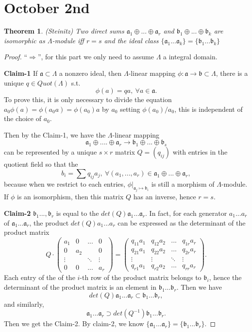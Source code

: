 \documentclass[11pt]{article}
\newtheorem{thm}{Theorem}[section]
\newcommand{\sca}{{\mathfrak a}}
\newcommand{\scb}{{\mathfrak b}}
\newcommand{\rta}{\rightarrow}
\newcommand{\Lrta}{\Longrightarrow}
\begin{document}
\section{October 2nd}
\begin{thm}
(Steinitz)
Two direct sums $\sca_1\oplus...\oplus \sca_r$ and $\scb_1\oplus...\oplus \scb_k$ are isomorphic as $\Lambda$-module iff $r=s$ and the ideal class $\{\sca_1...\sca_k\}=\{\scb_1...\scb_k\}$
\end{thm}
\begin{proof}
``$\Lrta$'', for this part we only need to assume $\Lambda$ a integral domain.

\textbf{Claim-1} If $\sca\subset \Lambda$ a nonzero ideal, then $\Lambda$-linear mapping $\phi:\sca\rta\scb\subset \Lambda$, there is a unique $q\in Quot(\Lambda)$ s.t. 
$$
\phi(a)=q a,\ \forall a\in \sca.
$$
To prove this, it is only necessary to divide the equation $a_0\phi(a)=\phi(a_0 a)=\phi(a_0)a$ by $a_0$ setting $\phi(a_0)/a_0$, this is independent of the choice of $a_0$.

Then by the Claim-1, we have the $\Lambda$-linear mapping
$$
\sca_1\oplus....\oplus \sca_r\rta \scb_1\oplus...\oplus \scb_s
$$
can be represented by a unique $s\times r$ matrix $Q=(q_{ij})$ with entries in the quotient field so that the 
$$
b_i= \sum q_{ij}a_j,\ \forall (a_1,...,a_r)\in \sca_1\oplus...\oplus \sca_r,
$$
because when we restrict to each entries, $\phi|_{\sca_j\mapsto \scb_i}$ is still a morphism of $\Lambda$-module.
If $\phi$ is an isomorphism, then this matrix $Q$ has an inverse, hence $r=s$. 

\textbf{Claim-2} $\scb_1...,\scb_r$ is  equal to the $det(Q)\sca_1...\sca_r$. In fact, for each generator $a_1...a_r$ of $\sca_1...\sca_r$, the product $det(Q)a_1...a_r$ can be expressed as the determinant of the product matrix
$$
Q\cdot\begin{pmatrix}
a_{1} & 0 & ... & 0\\
0 & a_{2} &  & 0\\
\vdots  &  & \ddots  & \vdots \\
0 & 0 & ... & a_{r}
\end{pmatrix} =\begin{pmatrix}
q_{11} a_{1} & q_{12} a_{2} & ... & q_{1r} a_{r}\\
q_{21} a_{1} & q_{22} a_{2} & ... & q_{2r} a_r\\
\vdots  & \vdots & \ddots  & \vdots \\
q_{r1} a_{1} & q_{r2} a_{2} & ... & q_{rr} a_{r}
\end{pmatrix}.
$$
Each entry of the of the $i$-th row of the product matrix belongs to $\scb_i$, hence the determinant of the product matrix is an element in $\scb_1...\scb_r$.
Then we have
$$
det(Q)\sca_1...\sca_r\subset \scb_1...\scb_r,
$$
and similarly,
$$
\sca_1...\sca_r\supset det(Q^{-1})\scb_1...\scb_r.
$$
Then we get the Claim-2. By claim-2, we know $\{\sca_1...\sca_r\}=\{\scb_1...\scb_r\}$.


\end{proof}
\end{document}
